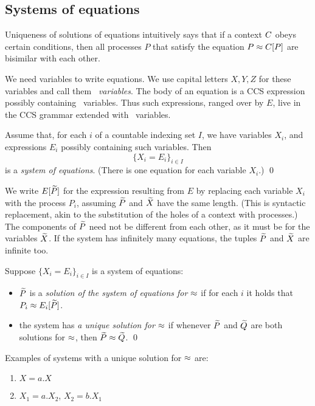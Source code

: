 \subsection{Systems of  equations}
\label{ss:SysEq}

             
Uniqueness of  solutions of equations \cite{Mil89} intuitively says that if  a context $C$ obeys
certain  conditions, 
then all processes $P$  that satisfy the equation $ P \approx C [P]$ are
bisimilar with each other.

We need variables to write equations. We  use
 capital
letters  $X,Y,Z$
 for  these variables and call them \emph{\behav\  variables}.
 The body of an equation is a CCS expression
possibly containing \behav\  variables. Thus such expressions, ranged
over by $E$, live in the CCS
grammar extended with \behav\  variables.

  
\begin{definition}
Assume that, for each $i$ of 
 a countable indexing set $I$, we have variables $X_i$, and expressions
$E_i$ possibly containing  such variables. 
Then 
$$\{  X_i = E_i\}_{i\in I}$$
is 
  a \emph{system of equations}. (There is one equation for each variable $X_i$.)
\qed\end{definition}

We write $E[\widetilde P]$ for the expression resulting from $E$ by
replacing each variable $X_i$   with the process $P_i$, assuming
$\widetilde P$ and $\widetilde X$ have the same length. (This is syntactic
replacement, akin to the substitution of the holes of a context with 
 processes.) 
The components of $\widetilde P$ need not be
 different from each other, as it must be for the variables $\widetilde X$.
If the system has infinitely many equations,
the  tuples $\widetilde P$ and $\widetilde X$
 are infinite too.
\begin{definition}
Suppose  $\{  X_i = E_i\}_{i\in I}$ is a system of equations: 
\begin{itemize}
\item
 $\widetilde P$ is a \emph{solution of the 
system of equations  for $\approx$} 
if for each $i$ it holds
that $P_i \approx E_i [\widetilde P]$.


\item the  system has 
\emph{a unique solution for $\approx$}  if whenever 
 $\widetilde P$ and $\widetilde Q$ are both solutions for $\approx$, then $\widetilde P \approx
 \widetilde Q$. \qed
\end{itemize} 
 \end{definition} 


Examples of systems with a  unique solution for $\approx$ are: 
\begin{enumerate}
\item
$ X = a. X$ 

\item 
$ X_1 = a.  X_2$, $ X_2 = b.  X_1$  

\end{enumerate}
 
